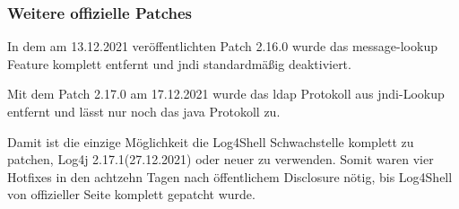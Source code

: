\subsubsection{Weitere offizielle Patches}
In dem am 13.12.2021 veröffentlichten Patch 2.16.0 wurde das message-lookup Feature komplett entfernt und \gls{jndi} standardmäßig deaktiviert.

Mit dem Patch 2.17.0 am 17.12.2021 wurde das \gls{ldap} Protokoll aus \gls{jndi}-Lookup entfernt und lässt nur noch das java Protokoll zu.

Damit ist die einzige Möglichkeit die Log4Shell Schwachstelle komplett zu patchen, Log4j 2.17.1(27.12.2021) oder neuer zu verwenden.
Somit waren vier Hotfixes in den achtzehn Tagen nach öffentlichem Disclosure nötig, bis Log4Shell von offizieller Seite komplett gepatcht wurde.
